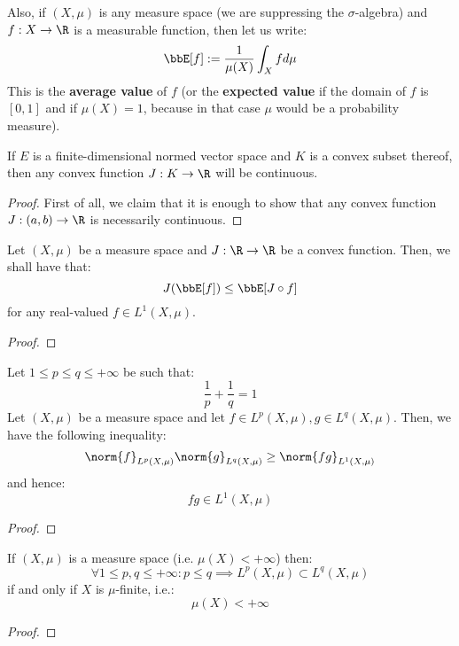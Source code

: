         Also, if $(X, \mu)$ is any measure space (we are suppressing the $\sigma$-algebra) and $f: X \to \R$ is a measurable function, then let us write:
            $$\bbE[f] := \frac{1}{\mu(X)} \int_X f d\mu$$
        This is the \textbf{average value} of $f$ (or the \textbf{expected value} if the domain of $f$ is $[0, 1]$ and if $\mu(X) = 1$, because in that case $\mu$ would be a probability measure).
        \begin{lemma}
            If $E$ is a finite-dimensional normed vector space and $K$ is a convex subset thereof, then any convex function $J: K \to \R$ will be continuous. 
        \end{lemma}
            \begin{proof}
                First of all, we claim that it is enough to show that any convex function $J: (a, b) \to \R$ is necessarily continuous. 
            \end{proof}
        \begin{lemma} \label{lemma: jensen_inequality}
            Let $(X, \mu)$ be a measure space and $J: \R \to \R$ be a convex function. Then, we shall have that:
                $$J( \bbE[f] ) \leq \bbE[ J \circ f ]$$
            for any real-valued $f \in L^1(X, \mu)$. 
        \end{lemma}
            \begin{proof}
                
            \end{proof}
        \begin{lemma}
            Let $1 \leq p \leq q \leq +\infty$ be such that:
                $$\frac1p + \frac1q = 1$$
            Let $(X, \mu)$ be a measure space and let $f \in L^p(X, \mu), g \in L^q(X, \mu)$. Then, we have the following inequality:
                $$\norm{f}_{L^p(X, \mu)} \norm{g}_{L^q(X, \mu)} \geq \norm{fg}_{L^1(X, \mu)}$$
            and hence:
                $$fg \in L^1(X, \mu)$$
        \end{lemma}
            \begin{proof}
            \end{proof}
        \begin{corollary}
            If $(X, \mu)$ is a measure space (i.e. $\mu(X) < +\infty$) then:
                $$\forall 1 \leq p, q \leq +\infty: p \leq q \implies L^p(X, \mu) \subset L^q(X, \mu)$$
            if and only if $X$ is $\mu$-finite, i.e.:
                $$\mu(X) < +\infty$$ 
        \end{corollary}
            \begin{proof}
                
            \end{proof}

